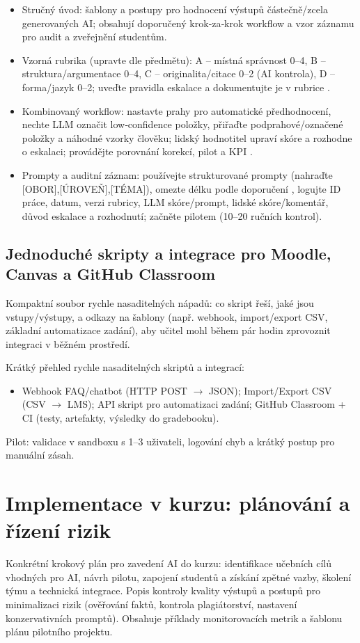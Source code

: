 \documentclass{report}%
\begin{document}
%
\begin{itemize}
\item Stručný úvod: šablony a postupy pro hodnocení výstupů částečně/zcela generovaných AI; obsahují doporučený krok‑za‑krok workflow a vzor záznamu pro audit a zveřejnění studentům.
\item Vzorná rubrika (upravte dle předmětu): A – místná správnost 0–4, B – struktura/argumentace 0–4, C – originalita/citace 0–2 (AI kontrola), D – forma/jazyk 0–2; uveďte pravidla eskalace a dokumentujte je v rubrice \cite{2-6}.
\item Kombinovaný workflow: nastavte prahy pro automatické předhodnocení, nechte LLM označit low‑confidence položky, přiřaďte podprahové/označené položky a náhodné vzorky člověku; lidský hodnotitel upraví skóre a rozhodne o eskalaci; provádějte porovnání korekcí, pilot a KPI \cite{2-6}.
\item Prompty a auditní záznam: používejte strukturované prompty (nahraďte [OBOR],[ÚROVEŇ],[TÉMA]), omezte délku podle doporučení \cite{3-2}, logujte ID práce, datum, verzi rubricy, LLM skóre/prompt, lidské skóre/komentář, důvod eskalace a rozhodnutí; začněte pilotem (10–20 ručních kontrol).
\end{itemize}%

%
\section{Jednoduché skripty a integrace pro Moodle, Canvas a GitHub Classroom}%
Kompaktní soubor rychle nasaditelných nápadů: co skript řeší, jaké jsou vstupy/výstupy, a odkazy na šablony (např. webhook, import/export CSV, základní automatizace zadání), aby učitel mohl během pár hodin zprovoznit integraci v běžném prostředí.%


%
Krátký přehled rychle nasaditelných skriptů a integrací:
\begin{itemize}
\item Webhook FAQ/chatbot (HTTP POST $\rightarrow$ JSON); Import/Export CSV (CSV $\rightarrow$ LMS); API skript pro automatizaci zadání; GitHub Classroom + CI (testy, artefakty, výsledky do gradebooku).
\end{itemize}
Pilot: validace v sandboxu s 1–3 uživateli, logování chyb a krátký postup pro manuální zásah.%

%
\chapter{Implementace v kurzu: plánování a řízení rizik}%
Konkrétní krokový plán pro zavedení AI do kurzu: identifikace učebních cílů vhodných pro AI, návrh pilotu, zapojení studentů a získání zpětné vazby, školení týmu a technická integrace. Popis kontroly kvality výstupů a postupů pro minimalizaci rizik (ověřování faktů, kontrola plagiátorství, nastavení konzervativních promptů). Obsahuje příklady monitorovacích metrik a šablonu plánu pilotního projektu.%
\end{document}
